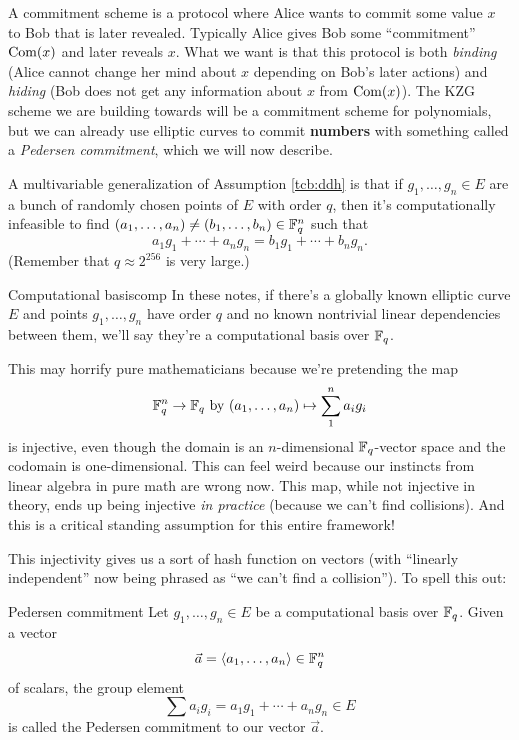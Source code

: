 A \alert{commitment scheme} is a protocol where Alice wants to commit
some value $x$ to Bob that is later revealed. Typically Alice gives
Bob some ``commitment'' $\operatorname{Com}(x)$ and later reveals
$x$. What we want is that this protocol is both \emph{binding} (Alice
cannot change her mind about $x$ depending on Bob's later actions) and
\emph{hiding} (Bob does not get any information about $x$ from
$\operatorname{Com}(x)$). The KZG scheme we are building towards will
be a commitment scheme for polynomials, but we can already use elliptic
curves to commit \textbf{numbers} with something called a \emph{Pedersen
commitment}, which we will now describe.

A multivariable generalization of Assumption \ref{tcb:ddh} is that if
$g_{1},\ldots,g_{n} \in E$ are a bunch of randomly chosen points of
$E$ with order $q$, then it's computationally infeasible to find
$( a_{1},\ldots,a_{n} ) \neq ( b_{1},\ldots,b_{n} ) \in \mathbb{F}_{q}^{n}$
such that
\[a_{1}g_{1} + \cdots + a_{n}g_{n} = b_{1}g_{1} + \cdots + b_{n}g_{n}.\]
(Remember that $q \approx 2^{256}$ is very large.)

\begin{definition}{Computational basis}{comp}
In these notes, if there's a globally known elliptic curve $E$
and points $g_1, \ldots, g_n$ have order $q$ and no known nontrivial
linear dependencies between them,
we'll say they're a \alert{computational basis over $\mathbb{F}_q$}.
\end{definition}

\begin{remark}{}{}
This may horrify pure mathematicians because we're pretending the map
\[ \mathbb{F}_q^n \rightarrow \mathbb{F}_q \text{ by } (a_1, \ldots, a_n) \mapsto \sum_1^n a_i g_i \]
is injective,
even though the domain is an $n$-dimensional $\mathbb{F}_q$-vector space
and the codomain is one-dimensional.
This can feel weird because our instincts from linear algebra in pure math
are wrong now. This map, while not injective in theory,
ends up being injective \emph{in practice} (because we can't find collisions).
And this is a critical standing assumption for this entire framework!
\end{remark}

This injectivity gives us a sort of hash function on vectors (with
``linearly independent'' now being phrased as ``we can't find a
collision''). To spell this out:

\begin{definition}{Pedersen commitment}{}
Let $g_1, \ldots, g_n \in E$ be a computational basis over $\mathbb{F}_q$.
Given a vector
\[ \vec{a} = \langle a_1, \ldots, a_n \rangle \in \mathbb{F}_q^n \] of scalars,
the group element
\[ \sum a_i g_i = a_1 g_1 + \cdots + a_n g_n \in E \]
is called the \alert{Pedersen commitment} to our vector $\vec{a}$.
\end{definition}

